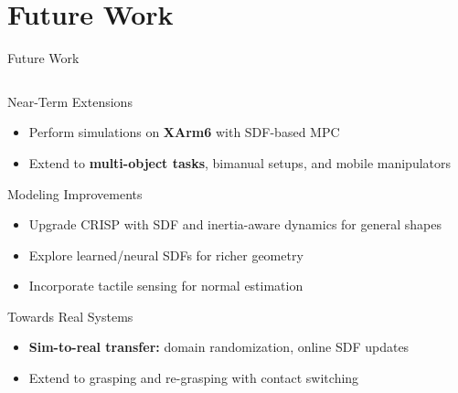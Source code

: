 \documentclass[10pt, aspectratio=169]{beamer}
\begin{document}
\section{Future Work}
\begin{frame}{Future Work}
\begin{columns}
    \begin{column}{0.8\textwidth}   
        \begin{block}{Near-Term Extensions}
        \begin{itemize}
          \item Perform simulations on \textbf{XArm6} with SDF-based MPC
          \item Extend to \textbf{multi-object tasks}, bimanual setups, and mobile manipulators
        \end{itemize}
        \end{block}
        
        \vspace{0.5em}
        
        \begin{block}{Modeling Improvements}
        \begin{itemize}
          \item Upgrade CRISP with SDF and inertia-aware dynamics for general shapes
          \item Explore learned/neural SDFs for richer geometry
          \item Incorporate tactile sensing for normal estimation
        \end{itemize}
        \end{block}
        
        \vspace{0.5em}
        
        \begin{block}{Towards Real Systems}
        \begin{itemize}
          \item \textbf{Sim-to-real transfer:} domain randomization, online SDF updates
          \item Extend to grasping and re-grasping with contact switching
        \end{itemize}
        \end{block}
    \end{column}


\end{columns}
\end{frame}
\end{document}

